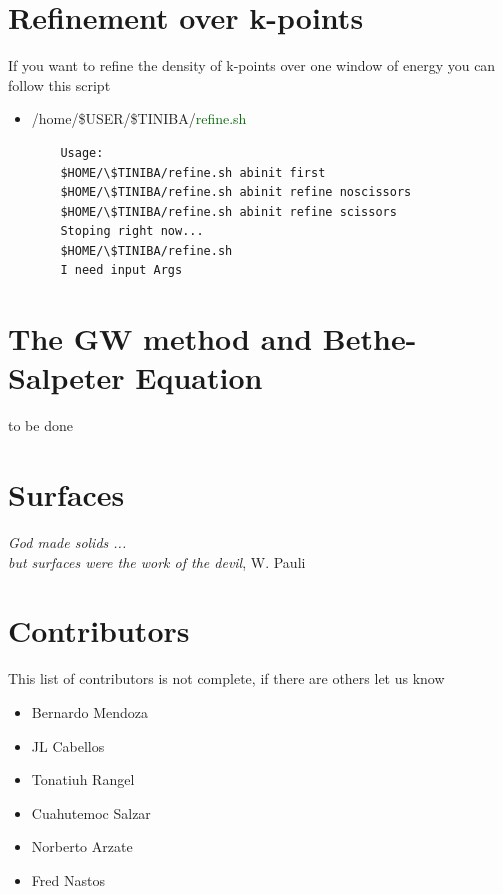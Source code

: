 \documentclass[openany,oneside]{book}
\numberwithin{equation}{section}
\begin{document}
\section{Refinement over k-points}
If you want to refine the density of k-points over one window of energy 
you can follow this script 
\begin{itemize}
 \item /home/\$USER/\$TINIBA/\textcolor{darkgreen}{refine.sh} 
\begin{verbatim}
	Usage:
	$HOME/\$TINIBA/refine.sh abinit first
	$HOME/\$TINIBA/refine.sh abinit refine noscissors
	$HOME/\$TINIBA/refine.sh abinit refine scissors
	Stoping right now...
	$HOME/\$TINIBA/refine.sh
	I need input Args
\end{verbatim}

\end{itemize}


\section{The GW method and Bethe-Salpeter Equation}
to be done 


\section{Surfaces }
\emph{God made solids ...\\
      but surfaces were the work of the devil}, W. Pauli\\                                  



\section{Contributors}
This list of contributors is not complete, if there are others let us know
\begin{itemize}
\item Bernardo Mendoza
\item JL Cabellos
\item Tonatiuh Rangel
\item Cuahutemoc Salzar
\item Norberto Arzate
\item Fred Nastos  
\end{itemize}
\end{document}
